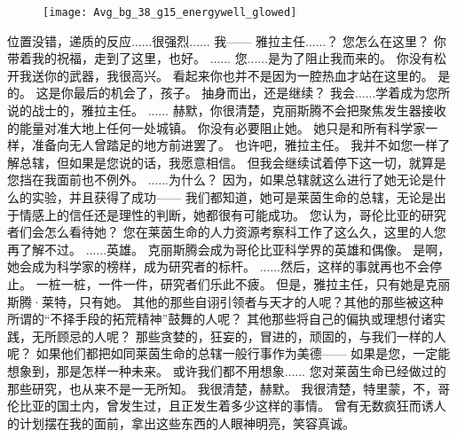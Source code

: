\documentclass[openany]{book}
\begin{document}
\begin{figure}[h]
    \centering
    \texttt{[image: Avg\_bg\_38\_g15\_energywell\_glowed]}
\end{figure}
\begin{dialogue}
     位置没错，递质的反应......很强烈......
     我——
     雅拉主任......？
     您怎么在这里？
     你带着我的祝福，走到了这里，也好。
     ......
     您......是为了阻止我而来的。
     你没有松开我送你的武器，我很高兴。
     看起来你也并不是因为一腔热血才站在这里的。
     是的。
     这是你最后的机会了，孩子。
     抽身而出，还是继续？
     我会......学着成为您所说的战士的，雅拉主任。
     ......
     赫默，你很清楚，克丽斯腾不会把聚焦发生器接收的能量对准大地上任何一处城镇。
     你没有必要阻止她。
     她只是和所有科学家一样，准备向无人曾踏足的地方前进罢了。
     也许吧，雅拉主任。
     我并不如您一样了解总辖，但如果是您说的话，我愿意相信。
     但我会继续试着停下这一切，就算是您挡在我面前也不例外。
     ......为什么？
     因为，如果总辖就这么进行了她无论是什么的实验，并且获得了成功——
     我们都知道，她可是莱茵生命的总辖，无论是出于情感上的信任还是理性的判断，她都很有可能成功。
     您认为，哥伦比亚的研究者们会怎么看待她？
     您在莱茵生命的人力资源考察科工作了这么久，这里的人您再了解不过。
     ......英雄。
     克丽斯腾会成为哥伦比亚科学界的英雄和偶像。
     是啊，她会成为科学家的榜样，成为研究者的标杆。
     ......然后，这样的事就再也不会停止。
     一桩一桩，一件一件，研究者们乐此不疲。
     但是，雅拉主任，只有她是克丽斯腾·莱特，只有她。
     其他的那些自诩引领者与天才的人呢？其他的那些被这种所谓的“不择手段的拓荒精神”鼓舞的人呢？
     其他那些将自己的偏执或理想付诸实践，无所顾忌的人呢？
     那些贪婪的，狂妄的，冒进的，顽固的，与我们一样的人呢？
     如果他们都把如同莱茵生命的总辖一般行事作为美德——
     如果是您，一定能想象到，那是怎样一种未来。
     或许我们都不用想象......
     您对莱茵生命已经做过的那些研究，也从来不是一无所知。
     我很清楚，赫默。
     我很清楚，特里蒙，不，哥伦比亚的国土内，曾发生过，且正发生着多少这样的事情。
     曾有无数疯狂而诱人的计划摆在我的面前，拿出这些东西的人眼神明亮，笑容真诚。

\end{dialogue}
\end{document}
